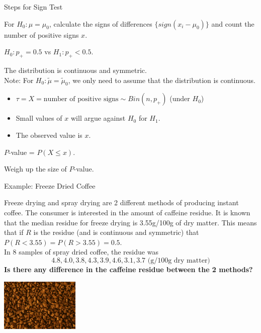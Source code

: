 \documentclass[t,xcolor=pdftex,dvipsnames,table]{beamer}\usepackage[]{graphicx}\usepackage[]{color}
\begin{document}
\begin{frame}[fragile]{Steps for Sign Test}
 
For $H_{0}: \mu = \mu_{0}$, calculate the signs of differences $\{ sign(x_{i}-\mu_{0}) \}$  and count the number of positive signs $x$.

\vspace{.5cm}
$H_{0}: p_{+} = 0.5$ vs $H_{1}: p_{+} < 0.5$. 

 The distribution is continuous and symmetric.\\
Note: For $H_{0}: \tilde{\mu} = \tilde{\mu}_{0}$, we only need to assume that the distribution is continuous. \\

\begin{itemize}
\item $\tau = X =  \mbox{number of positive signs} \sim Bin(n,p_{+})$ (under $H_{0}$) 
\item Small values of $x$ will argue against $H_{0}$ for $H_{1}$. 
\item The observed value is $x$. 
\end{itemize}

 $P$-value = $P( X \leq x)$.

 Weigh up the size of $P$-value.

\end{frame}  


\begin{frame}{Example: Freeze Dried Coffee}

Freeze drying and spray drying are 2 different methods of producing instant coffee. The consumer is interested in the amount of caffeine residue. It is known that the median residue for freeze drying is 3.55g/100g of dry matter. This means that if $R$ is the residue (and is continuous and symmetric) that
$P(R < 3.55) = P(R > 3.55) = 0.5$. \\

In 8 samples of spray dried coffee, the residue was
\[ 4.8 , 4.0, 3.8, 4.3, 3.9, 4.6, 3.1, 3.7 \mbox{ (g/100g dry matter)} \]
{\bf Is there any difference in the caffeine residue between the 2 methods?}

\begin{center}
\includegraphics[height=2.5cm]{../images/FreezeCoffee.jpg}
\end{center}
\end{frame}
\end{document}
